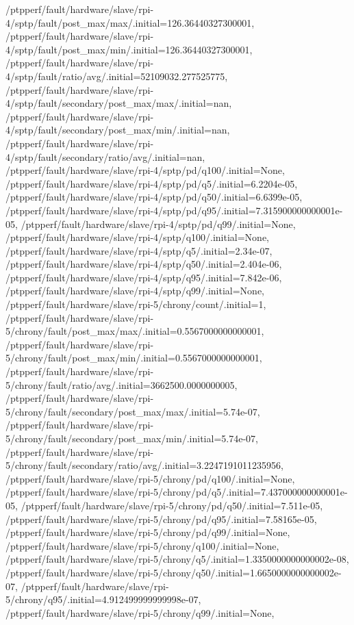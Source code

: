 {    /ptpperf/fault/hardware/slave/rpi-4/sptp/fault/post_max/max/.initial=126.36440327300001,
    /ptpperf/fault/hardware/slave/rpi-4/sptp/fault/post_max/min/.initial=126.36440327300001,
    /ptpperf/fault/hardware/slave/rpi-4/sptp/fault/ratio/avg/.initial=52109032.277525775,
    /ptpperf/fault/hardware/slave/rpi-4/sptp/fault/secondary/post_max/max/.initial=nan,
    /ptpperf/fault/hardware/slave/rpi-4/sptp/fault/secondary/post_max/min/.initial=nan,
    /ptpperf/fault/hardware/slave/rpi-4/sptp/fault/secondary/ratio/avg/.initial=nan,
    /ptpperf/fault/hardware/slave/rpi-4/sptp/pd/q100/.initial=None,
    /ptpperf/fault/hardware/slave/rpi-4/sptp/pd/q5/.initial=6.2204e-05,
    /ptpperf/fault/hardware/slave/rpi-4/sptp/pd/q50/.initial=6.6399e-05,
    /ptpperf/fault/hardware/slave/rpi-4/sptp/pd/q95/.initial=7.315900000000001e-05,
    /ptpperf/fault/hardware/slave/rpi-4/sptp/pd/q99/.initial=None,
    /ptpperf/fault/hardware/slave/rpi-4/sptp/q100/.initial=None,
    /ptpperf/fault/hardware/slave/rpi-4/sptp/q5/.initial=2.34e-07,
    /ptpperf/fault/hardware/slave/rpi-4/sptp/q50/.initial=2.404e-06,
    /ptpperf/fault/hardware/slave/rpi-4/sptp/q95/.initial=7.842e-06,
    /ptpperf/fault/hardware/slave/rpi-4/sptp/q99/.initial=None,
    /ptpperf/fault/hardware/slave/rpi-5/chrony/count/.initial=1,
    /ptpperf/fault/hardware/slave/rpi-5/chrony/fault/post_max/max/.initial=0.5567000000000001,
    /ptpperf/fault/hardware/slave/rpi-5/chrony/fault/post_max/min/.initial=0.5567000000000001,
    /ptpperf/fault/hardware/slave/rpi-5/chrony/fault/ratio/avg/.initial=3662500.0000000005,
    /ptpperf/fault/hardware/slave/rpi-5/chrony/fault/secondary/post_max/max/.initial=5.74e-07,
    /ptpperf/fault/hardware/slave/rpi-5/chrony/fault/secondary/post_max/min/.initial=5.74e-07,
    /ptpperf/fault/hardware/slave/rpi-5/chrony/fault/secondary/ratio/avg/.initial=3.2247191011235956,
    /ptpperf/fault/hardware/slave/rpi-5/chrony/pd/q100/.initial=None,
    /ptpperf/fault/hardware/slave/rpi-5/chrony/pd/q5/.initial=7.437000000000001e-05,
    /ptpperf/fault/hardware/slave/rpi-5/chrony/pd/q50/.initial=7.511e-05,
    /ptpperf/fault/hardware/slave/rpi-5/chrony/pd/q95/.initial=7.58165e-05,
    /ptpperf/fault/hardware/slave/rpi-5/chrony/pd/q99/.initial=None,
    /ptpperf/fault/hardware/slave/rpi-5/chrony/q100/.initial=None,
    /ptpperf/fault/hardware/slave/rpi-5/chrony/q5/.initial=1.3350000000000002e-08,
    /ptpperf/fault/hardware/slave/rpi-5/chrony/q50/.initial=1.6650000000000002e-07,
    /ptpperf/fault/hardware/slave/rpi-5/chrony/q95/.initial=4.912499999999998e-07,
    /ptpperf/fault/hardware/slave/rpi-5/chrony/q99/.initial=None,
}
